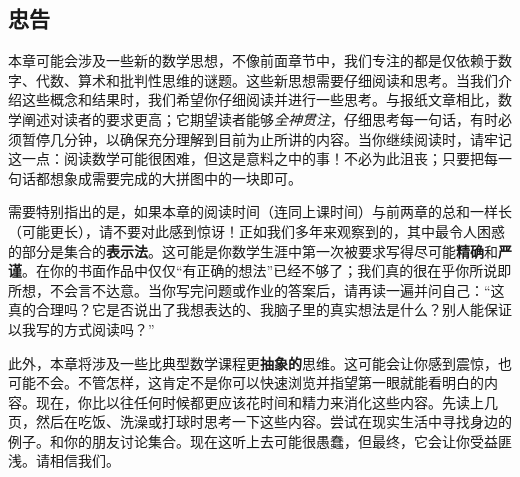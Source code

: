 \subsection{忠告}

本章可能会涉及一些新的数学思想，不像前面章节中，我们专注的都是仅依赖于数字、代数、算术和批判性思维的谜题。这些新思想需要仔细阅读和思考。当我们介绍这些概念和结果时，我们希望你仔细阅读并进行一些思考。与报纸文章相比，数学阐述对读者的要求更高；它期望读者能够\emph{全神贯注}，仔细思考每一句话，有时必须暂停几分钟，以确保充分理解到目前为止所讲的内容。当你继续阅读时，请牢记这一点：阅读数学可能很困难，但这是意料之中的事！不必为此沮丧；只要把每一句话都想象成需要完成的大拼图中的一块即可。

需要特别指出的是，如果本章的阅读时间（连同上课时间）与前两章的总和一样长（可能更长），请不要对此感到惊讶！正如我们多年来观察到的，其中最令人困惑的部分是集合的\textbf{表示法}。这可能是你数学生涯中第一次被要求写得尽可能\textbf{精确}和\textbf{严谨}。在你的书面作品中仅仅``有正确的想法''已经不够了；我们真的很在乎你所说即所想，不会言不达意。当你写完问题或作业的答案后，请再读一遍并问自己：``这真的合理吗？它是否说出了我想表达的、我脑子里的真实想法是什么？别人能保证以我写的方式阅读吗？''

此外，本章将涉及一些比典型数学课程更\textbf{抽象的}思维。这可能会让你感到震惊，也可能不会。不管怎样，这肯定不是你可以快速浏览并指望第一眼就能看明白的内容。现在，你比以往任何时候都更应该花时间和精力来消化这些内容。先读上几页，然后在吃饭、洗澡或打球时思考一下这些内容。尝试在现实生活中寻找身边的例子。和你的朋友讨论集合。现在这听上去可能很愚蠢，但最终，它会让你受益匪浅。请相信我们。